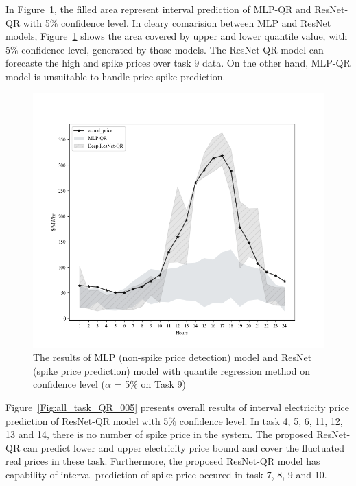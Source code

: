 \documentclass[review]{elsarticle}
\begin{document}
    In Figure~\ref{Fig:compare_spike_and_non_spike_model}, the filled area represent interval prediction of MLP-QR and ResNet-QR with 5$\%$ confidence level.
    In cleary comarision between MLP and ResNet models, Figure~\ref{Fig:compare_spike_and_non_spike_model} shows the area covered by upper and lower quantile value, with 5$\%$ confidence level, generated by those models.
    The ResNet-QR model can forecaste the high and spike prices over task 9 data. On the other hand, MLP-QR model is unsuitable to handle price spike prediction.
    \begin{figure}[H]
      \centering
      \includegraphics[width=12cm]{Task_9-compare_between_non-spike_and_spike}
      \caption{The results of MLP (non-spike price detection) model and ResNet (spike price prediction) model with quantile regression method on confidence level ($\alpha$ = 5$\%$ on Task 9)}
      \label{Fig:compare_spike_and_non_spike_model}
    \end{figure}

    Figure~\ref{Fig:all_task_QR_005} presents overall results of interval electricity price prediction of ResNet-QR model with 5$\%$ confidence level.
    In task 4, 5, 6, 11, 12, 13 and 14, there is no number of spike price in the system.
    The proposed ResNet-QR can predict lower and upper electricity price bound and cover the fluctuated real prices in these task.
    Furthermore, the proposed ResNet-QR model has capability of interval prediction of spike price occured in task 7, 8, 9 and 10.
\end{document}
